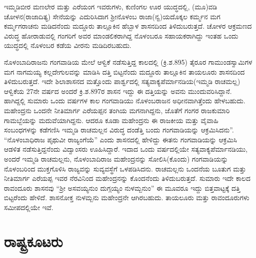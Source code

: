 ಇಮ್ಮಡಿಬೀರ ಮಣಲೇರ ಮತ್ತು ಎರೆಯಂಗ ಇವರುಗಳು, ಕುಣಿಂಗಲ ಊರ ಯುದ್ಧದಲ್ಲಿ, (ಮೂ)ವಡಿ ಚೋಳನ\break (ರಾಜಾದಿತ್ಯ) ಸೇನೆಯನ್ನು ಎದುರಿಸಿದಾಗ ಶ‍್ರೀನೊಳಂಬ ರಾಜಾ(ನ್ವ)ಯದೊಕ್ಕಲ ಕರ್ಮ್ಮನ ಮಗ ಕರ್ಮ್ಮಗರಾಚನು ಮಡಿದನೆಂದು ಮದ್ದೂರು ತಾಲ್ಲೂಕಿನ ಹೆಬ್ಬಾಳ ಶಾಸನದಿಂದ ತಿಳಿದುಬರುತ್ತದೆ. ಚೋಳರ ಆಕ್ರಮಣದ ವಿರುದ್ಧ ಹೋರಾಡುವಲ್ಲಿ ಗಂಗರಿಗೆ ಅವರ ಮಾಂಡಲಿಕರಾಗಿದ್ದ ನೊಳಂಬರೂ ಸಹಾಯಕರಾಗಿದ್ದು ಇಂತಹ ಒಂದು ಯುದ್ಧದಲ್ಲಿ ನೊಳಂಬರ ಕಡೆಯ ವೀರನು ಮಡಿದಿರಬಹುದು.

ನೊಳಂಬಾದಿರಾಜನು ಗಂಗವಾಡಿಯ ಮೇಲೆ ಆಳ್ವಿಕೆ ನಡೆಸುತ್ತಿದ್ದ ಕಾಲದಲ್ಲಿ (ಕ್ರಿ.ಶ.895) ತೈರೂರ ಗಾಮುಂಡಸ್ವಾಮಿ\-ಗಳ ಮಗ ನಾಗಮಯ್ಯ ಕಲ್ಲದೇಗುಲವನ್ನು ಮಾಡಿಸಿ ದತ್ತಿ ಬಿಟ್ಟನೆಂದು ಮದ್ದೂರು ತಾಲ್ಲೂಕಿನ ತಾಯಲೂರು ಶಾಸನದಿಂದ ತಿಳಿದುಬರುತ್ತದೆ. ಇದೇ ಶಿಲಾಶಾಸನದ ಮತ್ತೊಂದು ಪಾರ್ಶ್ವದಲ್ಲಿ ಸತ್ಯವಾಕ್ಯಪೆರ್ಮಾನಡಿಯ(ಇಮ್ಮಡಿ ರಾಚಮಲ್ಲ) ಆಳ್ವಿಕೆಯ 27ನೇ ವರ್ಷದ ಅಂದರೆ ಕ್ರಿ.ಶ.897ರ ಶಾಸನ ಇದ್ದು ಈ ದತ್ತಿಯನ್ನು ಅವನು ಮುಂದುವರಿಸಿದ್ದಾನೆ. ಹಾಗಿದ್ದಲ್ಲಿ ಸುಮಾರು ಒಂದು ವರ್ಷಗಳ ಕಾಲ ಗಂಗವಾಡಿಯು ನೊಳಂಬರಾಜನ ಅಧೀನವಾಗಿತ್ತೆಂದು ಹೇಳಬಹುದು. ಮಹೇಂದ್ರನು ಒಂದನೇ ನೀತಿಮಾರ್ಗ ಎರೆಯಪ್ಪನ ತಂಗಿಯ ಮಗನಾಗಿದ್ದನು, ಜೊತೆಗೆ ಗಂಗರ ರಾಜಕುಮಾರಿ ಗಾಮಬ್ಬೆಯನ್ನು ಮದುವೆ\-ಯಾಗಿದ್ದನು. ಆದರೂ ಕೂಡಾ ಮಹೇಂದ್ರನು ಈ ರಾಜಕೀಯ ಮತ್ತು ವೈವಾಹಿ ಸಂಬಂಧಗಳನ್ನು ಕಡೆಗಣಿಸಿ ಇಮ್ಮಡಿ ರಾಚಮಲ್ಲನ ವಿರುದ್ಧ ದಂಡೆತ್ತಿ ಬಂದು ಗಂಗವಾಡಿಯನ್ನು ಆಕ್ರಮಿಸಿದನು”. “ನೊಳಂಬಾಧಿರಾಜ ಪೃಥುವೀ ರಾಜ್ಯಂಗೆಯೆ” ಎಂದು ಶಾಸನದಲ್ಲಿ ಹೇಳಿದ್ದು ಈತನು ಗಂಗವಾಡಿಯನ್ನು ಆಕ್ರಮಿಸಿ ಆಡಳಿತ ನಡೆಸುತ್ತಿದ್ದನೆಂದು ವಿದ್ವಾಂಸರು ಊಹಿಸಿದ್ದಾರೆ. ಇದಾದ ಒಂದು ವರ್ಷದಲ್ಲಿಯೇ ಸತ್ಯವಾಕ್ಯಪೆರ್ಮಾನಡಿಯು, ಅಂದರೆ ಇಮ್ಮಡಿ ರಾಚಮಲ್ಲನು, ನೊಳಂಬಾದಿರಾಜ ಮಹೇಂದ್ರನನ್ನು ಸೋಲಿಸಿ(ಕೊಂದು) ಗಂಗವಾಡಿಯನ್ನು ನೊಳಂಬರಿಂದ ಮುಕ್ತಗೊಳಿಸಿ ರಾಜ್ಯವನ್ನು ಸುವ್ಯವಸ್ಥೆಗೆ ಒಳಪಡಿ\-ಸಿದನು. ರಾಚಮಲ್ಲನು ಒಂದನೆಯ ಬೂತುಗ ಮತ್ತು ನೀತಿಮಾರ್ಗ ಎರೆಯಪ್ಪ ಇವರ ನೆರವಿನಿಂದ ಮಹೇಂದ್ರನನ್ನು ಕೊಂದನೆಂದು ತಿಳಿದುಬರುತ್ತದೆ. ಸುಮಾರು ಇದೇ ಕಾಲದ ರಾವಂದೂರು ಶಾಸನವು “ಶ‍್ರೀ ಅಸವಯ್ಯನುಂ ದುಗ್ಗಯ್ಯಂ ನುಳಮ್ಬನುಂ” ಈ ಮೂವರೂ ಇದ್ದು ಬಿತ್ತವಾಟ್ಟಕ್ಕೆ ದತ್ತಿ ಬಿಟ್ಟರೆಂದು ಹೇಳಿದೆ. ಶಾಸನೋಕ್ತ ನುಳಮ್ಬನು ಮಹೇಂದ್ರನೇ ಆಗಿರಬಹುದು. ತಾಯಲೂರು ಮತ್ತು ರಾವಂದೂರುಗಳು ಸಮೀಪದಲ್ಲಿಯೇ ಇವೆ.


\section{ರಾಷ್ಟ್ರಕೂಟರು}

